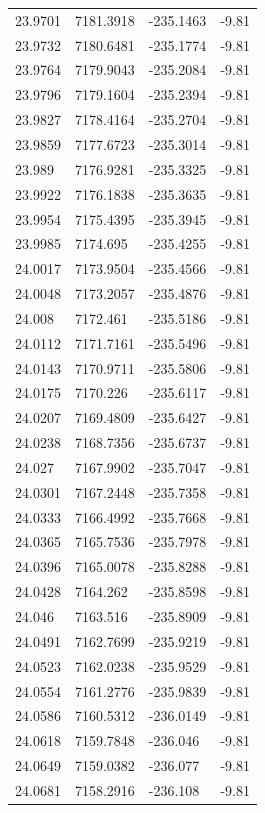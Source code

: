 \begin{table}[H]
\begin{tabular}{llll}
23.9701 & 7181.3918 & -235.1463 & -9.81 \\
23.9732 & 7180.6481 & -235.1774 & -9.81 \\
23.9764 & 7179.9043 & -235.2084 & -9.81 \\
23.9796 & 7179.1604 & -235.2394 & -9.81 \\
23.9827 & 7178.4164 & -235.2704 & -9.81 \\
23.9859 & 7177.6723 & -235.3014 & -9.81 \\
23.989 & 7176.9281 & -235.3325 & -9.81 \\
23.9922 & 7176.1838 & -235.3635 & -9.81 \\
23.9954 & 7175.4395 & -235.3945 & -9.81 \\
23.9985 & 7174.695 & -235.4255 & -9.81 \\
24.0017 & 7173.9504 & -235.4566 & -9.81 \\
24.0048 & 7173.2057 & -235.4876 & -9.81 \\
24.008 & 7172.461 & -235.5186 & -9.81 \\
24.0112 & 7171.7161 & -235.5496 & -9.81 \\
24.0143 & 7170.9711 & -235.5806 & -9.81 \\
24.0175 & 7170.226 & -235.6117 & -9.81 \\
24.0207 & 7169.4809 & -235.6427 & -9.81 \\
24.0238 & 7168.7356 & -235.6737 & -9.81 \\
24.027 & 7167.9902 & -235.7047 & -9.81 \\
24.0301 & 7167.2448 & -235.7358 & -9.81 \\
24.0333 & 7166.4992 & -235.7668 & -9.81 \\
24.0365 & 7165.7536 & -235.7978 & -9.81 \\
24.0396 & 7165.0078 & -235.8288 & -9.81 \\
24.0428 & 7164.262 & -235.8598 & -9.81 \\
24.046 & 7163.516 & -235.8909 & -9.81 \\
24.0491 & 7162.7699 & -235.9219 & -9.81 \\
24.0523 & 7162.0238 & -235.9529 & -9.81 \\
24.0554 & 7161.2776 & -235.9839 & -9.81 \\
24.0586 & 7160.5312 & -236.0149 & -9.81 \\
24.0618 & 7159.7848 & -236.046 & -9.81 \\
24.0649 & 7159.0382 & -236.077 & -9.81 \\
24.0681 & 7158.2916 & -236.108 & -9.81 \\

\end{tabular}
\end{table}
